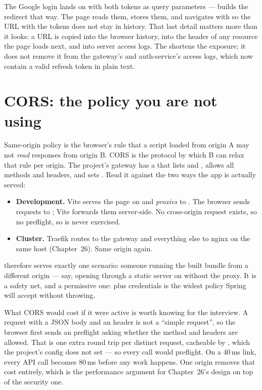 The Google login lands on  with both tokens as
query parameters ---  builds the
redirect that way. The page reads them, stores them, and navigates
with  so the URL with the tokens does not stay in
history. That last detail matters more than it looks: a URL is copied
into the browser history, into the  header of any
resource the page loads next, and into server access logs. The
 shortens the exposure; it does not remove it from the
gateway's and auth-service's access logs, which now contain a valid
refresh token in plain text.

\section{CORS: the policy you are not using}

Same-origin policy is the browser's rule that a script loaded from
origin A may not \emph{read} responses from origin B. CORS is the
protocol by which B can relax that rule per origin. The project's
gateway has a  that lists  and
, allows all methods and headers, and sets
. Read it against the two ways the app is
actually served:

\begin{itemize}
  \item \textbf{Development.} Vite serves the page on  and
  \emph{proxies}  to . The browser sends
  requests to ; Vite forwards them server-side. No
  cross-origin request exists, so no preflight, so 
  is never exercised.
  \item \textbf{Cluster.} Traefik routes  to the gateway
  and everything else to nginx on the same host (Chapter~26). Same
  origin again.
\end{itemize}

 therefore serves exactly one scenario: someone
running the built bundle from a different origin --- say, opening
 through a static server on  without
the proxy. It is a safety net, and a permissive one:
 plus credentials is the widest policy
Spring will accept without throwing.

What CORS would cost if it were active is worth knowing for the
interview. A request with a JSON body and an 
header is not a ``simple request'', so the browser first sends an
 preflight asking whether the method and headers are
allowed. That is one extra round trip per distinct request, cacheable
by , which the project's config does not
set --- so every call would preflight. On a 40\,ms link, every API
call becomes 80\,ms before any work happens. One origin removes that
cost entirely, which is the performance argument for Chapter~26's
design on top of the security one.

